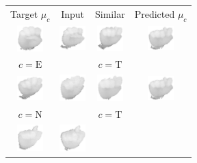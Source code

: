 \documentclass[a4paper]{article}
\begin{document}
\begin{figure}
\centering
\begin{tabular}{cccc}
Target $\mu_c$ & Input & Similar & Predicted $\mu_c$ \\

\includegraphics[width=1cm]{img/S01_C14m_0009.eps} & 
\includegraphics[width=1cm]{img/S01_C14_0186.eps} & 
\includegraphics[width=1cm]{img/S01_C28_0015.eps} &  
\includegraphics[width=1cm]{img/S01_C28m_0100.eps} \\ 
$c=\text{E}$ & & $c=\text{T}$ \\
\includegraphics[width=1cm]{img/S01_C22m_0035.eps} & 
\includegraphics[width=1cm]{img/S01_C22_0139.eps} & 
\includegraphics[width=1cm]{img/S01_C28_0142.eps} & 
\includegraphics[width=1cm]{img/S01_C28m_0100.eps} \\ 
$c=\text{N}$ & & $c=\text{T}$ \\
\includegraphics[width=1cm]{img/S02_C28m_0052.eps} & 
\includegraphics[width=1cm]{img/S02_C28_0199.eps} & 

\end{tabular}
\end{figure}
\end{document}

